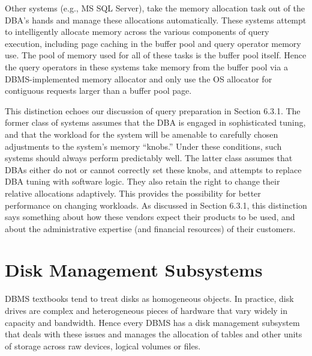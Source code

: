 \documentclass[a4paper,11pt,twoside,openright]{book}
\begin{document}
Other systems (e.g., MS SQL Server), take the memory allocation task out
of the DBA's hands and manage these allocations automatically. These
systems attempt to intelligently allocate memory across the various
components of query execution, including page caching in the buffer pool
and query operator memory use. The pool of memory used for all of these
tasks is the buffer pool itself. Hence the query operators in these
systems take memory from the buffer pool via a DBMS-implemented memory
allocator and only use the OS allocator for contiguous requests larger
than a buffer pool page.

This distinction echoes our discussion of query preparation in Section
6.3.1. The former class of systems assumes that the DBA is engaged in
sophisticated tuning, and that the workload for the system will be
amenable to carefully chosen adjustments to the system's memory
``knobs.'' Under these conditions, such systems should always perform
predictably well. The latter class assumes that DBAs either do not or
cannot correctly set these knobs, and attempts to replace DBA tuning
with software logic. They also retain the right to change their relative
allocations adaptively. This provides the possibility for better
performance on changing workloads. As discussed in Section 6.3.1, this
distinction says something about how these vendors expect their products
to be used, and about the administrative expertise (and financial
resources) of their customers.

\hypertarget{disk-management-subsystems}{%
\section{Disk Management
Subsystems}\label{disk-management-subsystems}}

DBMS textbooks tend to treat disks as homogeneous objects. In practice,
disk drives are complex and heterogeneous pieces of hardware that vary
widely in capacity and bandwidth. Hence every DBMS has a disk management
subsystem that deals with these issues and manages the allocation of
tables and other units of storage across raw devices, logical volumes or
files.
\end{document}
